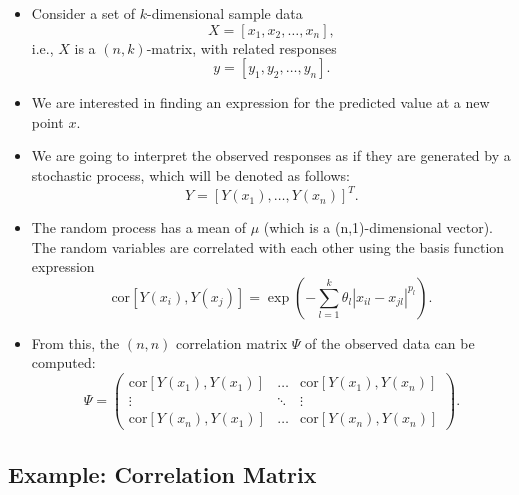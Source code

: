\documentclass[
  letterpaper,
  DIV=11,
  numbers=noendperiod]{scrreprt}
\providecommand{\tightlist}{%
  \setlength{\itemsep}{0pt}\setlength{\parskip}{0pt}}\usepackage{longtable,booktabs,array}
\begin{document}
\begin{itemize}
\tightlist
\item
  Consider a set of \(k\)-dimensional sample data
  \[X = [x_1, x_2, \ldots, x_n],\] i.e., \(X\) is a \((n,k)\)-matrix,
  with related responses \[y = [y_1, y_2, \ldots, y_n].\]
\item
  We are interested in finding an expression for the predicted value at
  a new point \(x\).
\item
  We are going to interpret the observed responses as if they are
  generated by a stochastic process, which will be denoted as follows:
  \begin{equation} Y = [Y(x_1), \ldots, Y(x_n) ]^T. \end{equation}
\item
  The random process has a mean of \(\mu\) (which is a (n,1)-dimensional
  vector). The random variables are correlated with each other using the
  basis function expression
  \begin{equation} \text{cor} [Y(x_i), Y(x_j)] =  \exp \left( - \sum_{l=1}^k \theta_l | x_{il} - x_{jl} | ^{p_l} \right). \end{equation}
\item
  From this, the \((n,n)\) correlation matrix \(\Psi\) of the observed
  data can be computed:
  \begin{equation} \Psi = \begin{pmatrix} \text{cor} [Y(x_1), Y(x_1)] & \ldots & \text{cor} [Y(x_1), Y(x_n)] \\  \vdots & \ddots & \vdots \\ \text{cor} [Y(x_n), Y(x_1)] &  \ldots & \text{cor} [Y(x_n), Y(x_n)] \end{pmatrix} .\end{equation}
\end{itemize}

\hypertarget{example-correlation-matrix}{%
\subsection{Example: Correlation
Matrix}\label{example-correlation-matrix}}
\end{document}
